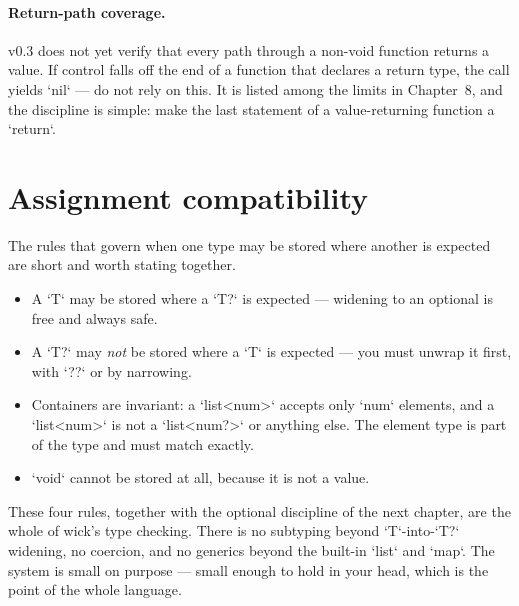 \paragraph{Return-path coverage.} v0.3 does not yet verify that every path
through a non-void function returns a value. If control falls off the end of a
function that declares a return type, the call yields `nil` --- do not rely on
this. It is listed among the limits in Chapter~8, and the discipline is
simple: make the last statement of a value-returning function a `return`.

\section{Assignment compatibility}

The rules that govern when one type may be stored where another is expected
are short and worth stating together.

\begin{itemize}
\item A `T` may be stored where a `T?` is expected --- widening to an optional
is free and always safe.
\item A `T?` may \emph{not} be stored where a `T` is expected --- you must
unwrap it first, with `??` or by narrowing.
\item Containers are invariant: a `list<num>` accepts only `num` elements, and
a `list<num>` is not a `list<num?>` or anything else. The element type is part
of the type and must match exactly.
\item `void` cannot be stored at all, because it is not a value.
\end{itemize}

\noindent
These four rules, together with the optional discipline of the next chapter,
are the whole of wick's type checking. There is no subtyping beyond
`T`-into-`T?` widening, no coercion, and no generics beyond the built-in
`list` and `map`. The system is small on purpose --- small enough to hold in
your head, which is the point of the whole language.
